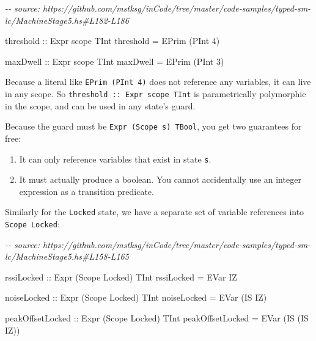 \documentclass[]{article}
\newenvironment{Shaded}{}{}
\newcommand{\CommentTok}[1]{\textcolor[rgb]{0.38,0.63,0.69}{\textit{#1}}}
\newcommand{\DataTypeTok}[1]{\textcolor[rgb]{0.56,0.13,0.00}{#1}}
\newcommand{\DecValTok}[1]{\textcolor[rgb]{0.25,0.63,0.44}{#1}}
\newcommand{\NormalTok}[1]{#1}
\newcommand{\OtherTok}[1]{\textcolor[rgb]{0.00,0.44,0.13}{#1}}
\begin{document}
\begin{Shaded}
\begin{Highlighting}[]
\CommentTok{{-}{-} source: https://github.com/mstksg/inCode/tree/master/code{-}samples/typed{-}sm{-}lc/MachineStage5.hs\#L182{-}L186}

\OtherTok{threshold ::} \DataTypeTok{Expr}\NormalTok{ scope }\DataTypeTok{TInt}
\NormalTok{threshold }\OtherTok{=} \DataTypeTok{EPrim}\NormalTok{ (}\DataTypeTok{PInt} \DecValTok{4}\NormalTok{)}

\OtherTok{maxDwell ::} \DataTypeTok{Expr}\NormalTok{ scope }\DataTypeTok{TInt}
\NormalTok{maxDwell }\OtherTok{=} \DataTypeTok{EPrim}\NormalTok{ (}\DataTypeTok{PInt} \DecValTok{3}\NormalTok{)}
\end{Highlighting}
\end{Shaded}

Because a literal like \texttt{EPrim\ (PInt\ 4)} does not reference any
variables, it can live in any scope. So
\texttt{threshold\ ::\ Expr\ scope\ TInt} is parametrically polymorphic in the
scope, and can be used in any state's guard.

Because the guard must be \texttt{Expr\ (Scope\ s)\ TBool}, you get two
guarantees for free:

\begin{enumerate}
\def\labelenumi{\arabic{enumi}.}
\tightlist
\item
  It can only reference variables that exist in state \texttt{s}.
\item
  It must actually produce a boolean. You cannot accidentally use an integer
  expression as a transition predicate.
\end{enumerate}

Similarly for the \texttt{Locked} state, we have a separate set of variable
references into \texttt{Scope\ Locked}:

\begin{Shaded}
\begin{Highlighting}[]
\CommentTok{{-}{-} source: https://github.com/mstksg/inCode/tree/master/code{-}samples/typed{-}sm{-}lc/MachineStage5.hs\#L158{-}L165}

\OtherTok{rssiLocked ::} \DataTypeTok{Expr}\NormalTok{ (}\DataTypeTok{Scope} \DataTypeTok{Locked}\NormalTok{) }\DataTypeTok{TInt}
\NormalTok{rssiLocked }\OtherTok{=} \DataTypeTok{EVar} \DataTypeTok{IZ}

\OtherTok{noiseLocked ::} \DataTypeTok{Expr}\NormalTok{ (}\DataTypeTok{Scope} \DataTypeTok{Locked}\NormalTok{) }\DataTypeTok{TInt}
\NormalTok{noiseLocked }\OtherTok{=} \DataTypeTok{EVar}\NormalTok{ (}\DataTypeTok{IS} \DataTypeTok{IZ}\NormalTok{)}

\OtherTok{peakOffsetLocked ::} \DataTypeTok{Expr}\NormalTok{ (}\DataTypeTok{Scope} \DataTypeTok{Locked}\NormalTok{) }\DataTypeTok{TInt}
\NormalTok{peakOffsetLocked }\OtherTok{=} \DataTypeTok{EVar}\NormalTok{ (}\DataTypeTok{IS}\NormalTok{ (}\DataTypeTok{IS} \DataTypeTok{IZ}\NormalTok{))}
\end{Highlighting}
\end{Shaded}
\end{document}
